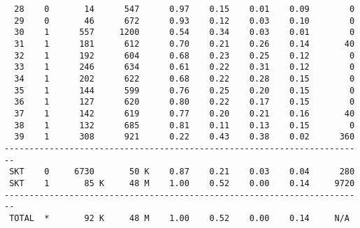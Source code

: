 \begin{lstlisting}
  28    0       14      547      0.97    0.15    0.01    0.09        0
  29    0       46      672      0.93    0.12    0.03    0.10        0
  30    1      557     1200      0.54    0.34    0.03    0.01        0
  31    1      181      612      0.70    0.21    0.26    0.14       40
  32    1      192      604      0.68    0.23    0.25    0.12        0
  33    1      246      634      0.61    0.22    0.31    0.12        0
  34    1      202      622      0.68    0.22    0.28    0.15        0
  35    1      144      599      0.76    0.25    0.20    0.15        0
  36    1      127      620      0.80    0.22    0.17    0.15        0
  37    1      142      619      0.77    0.20    0.21    0.16       40
  38    1      132      685      0.81    0.11    0.13    0.15        0
  39    1      308      921      0.22    0.43    0.38    0.02      360
------------------------------------------------------------------------
 SKT    0     6730       50 K    0.87    0.21    0.03    0.04      280
 SKT    1       85 K     48 M    1.00    0.52    0.00    0.14     9720
------------------------------------------------------------------------
 TOTAL  *       92 K     48 M    1.00    0.52    0.00    0.14     N/A
\end{lstlisting}




